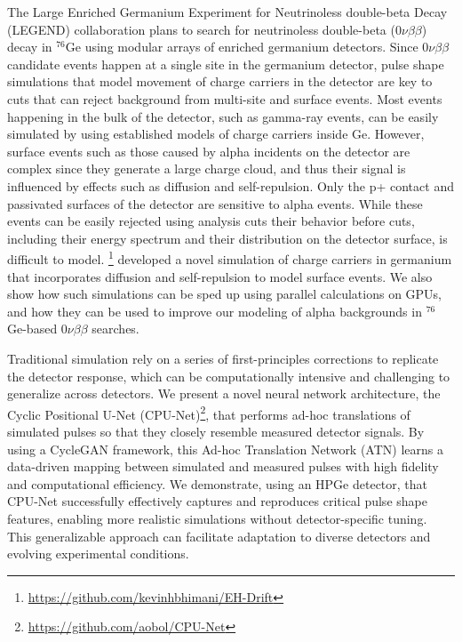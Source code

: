 The Large Enriched Germanium Experiment for Neutrinoless double-beta Decay (LEGEND) collaboration plans to search for neutrinoless double-beta ($0\nu\beta\beta$) decay in ${}^{76}$Ge using modular arrays of enriched germanium detectors. Since $0\nu\beta\beta$ candidate events happen at a single site in the germanium detector, pulse shape simulations that model movement of charge carriers in the detector are key to cuts that can reject background from multi-site and surface events. Most events happening in the bulk of the detector, such as gamma-ray events, can be easily simulated by using established models of charge carriers inside Ge. However, surface events such as those caused by alpha incidents on the detector are complex since they generate a large charge cloud, and thus their signal is influenced by effects such as diffusion and self-repulsion. Only the p+ contact and passivated surfaces of the detector are sensitive to alpha events. While these events can be easily rejected using analysis cuts their behavior before cuts, including their energy spectrum and their distribution on the detector surface, is difficult to model. {\tdsim} \footnote{\url{https://github.com/kevinhbhimani/EH-Drift}} developed a novel simulation of charge carriers in germanium that incorporates diffusion and self-repulsion to model surface events. We also show how such simulations can be sped up using parallel calculations on GPUs, and how they can be used to improve our modeling of alpha backgrounds in ${}^{76}$Ge-based $0\nu\beta\beta$ searches.

Traditional simulation rely on a series of first-principles corrections to replicate the detector response, which can be computationally intensive and challenging to generalize across detectors. We present a novel neural network architecture, the Cyclic Positional U-Net (CPU-Net)\footnote{\url{https://github.com/aobol/CPU-Net}}, that performs ad-hoc translations of simulated pulses so that they closely resemble measured detector signals. By using a CycleGAN framework, this Ad-hoc Translation Network (ATN) learns a data-driven mapping between simulated and measured pulses with high fidelity and computational efficiency. We demonstrate, using an HPGe detector, that CPU-Net successfully effectively captures and reproduces critical pulse shape features, enabling more realistic simulations without detector-specific tuning. This generalizable approach can facilitate adaptation to diverse detectors and evolving experimental conditions.

\clearpage
